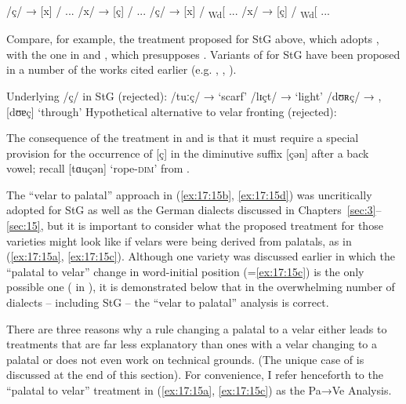 \ea\label{ex:17:15}
\ea  /ç/ → [x] / ...     \label{ex:17:15a}
\ex /x/ → [ç] / ...  \label{ex:17:15b}
\ex /ç/ → [x] / \textsubscript{Wd}[ ...\label{ex:17:15c}
\ex /x/ → [ç] / \textsubscript{Wd}[ ...\label{ex:17:15d}
\z 
\z 

Compare, for example, the treatment proposed for StG above, which adopts , with the one in  and , which presupposes . Variants of  for StG have been proposed in a number of the works cited earlier (e.g. \citealt{Wurzel1980}, \citealt{MeinholdStock1982}, \citealt{Hall1989}).



\ea%
\label{ex:17:16}Underlying /ç/ in StG (rejected):
\ea /tuːç/ \tab →  \tab  [tuːx]         \tab  ‘scarf’
\ex /lɪçt/ \tab →  \tab  [lɪçt]         \tab ‘light’
\ex /dʊʀç/ \tab →  \tab  [dʊʀç], [dʊɐç] \tab ‘through’
\z
\ex%
\label{ex:17:17}Hypothetical alternative to velar fronting (rejected):\\
\z 

The consequence of the treatment in  and  is that it must require a special provision for  the occurrence of [ç] in the diminutive suffix [çən] after a back vowel; recall [tɑuçən] ‘rope-\textsc{dim}’ from .

The “velar to palatal” approach in (\ref{ex:17:15b}, \ref{ex:17:15d}) was uncritically adopted for StG as well as  the German dialects discussed in Chapters~\ref{sec:3}--\ref{sec:15}, but it is important to consider what the proposed treatment for those varieties might look like if velars were being derived from palatals, as in (\ref{ex:17:15a}, \ref{ex:17:15c}). Although one variety was discussed earlier in which the “palatal to velar” change in word-initial position (=\ref{ex:17:15c}) is the only possible one ( in ), it is demonstrated below that in the overwhelming number of dialects -- including StG -- the “velar to palatal” analysis is correct.

There are three reasons why a rule changing a palatal to a velar either leads to treatments that are far less explanatory than ones with a velar changing to a palatal or does not even work on technical grounds. (The unique case of  is discussed at the end of this section). For convenience, I refer henceforth to the “palatal to velar” treatment in (\ref{ex:17:15a}, \ref{ex:17:15c}) as the Pa→Ve Analysis.

